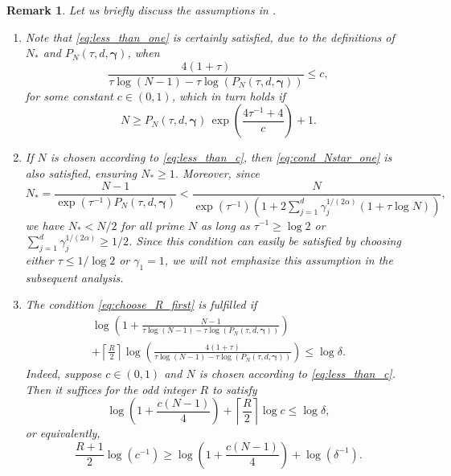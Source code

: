 \documentclass[pdflatex,sn-basic,Numbered]{sn-jnl}%
\newcommand{\bsgamma}{\boldsymbol{\gamma}}
\theoremstyle{thmstyleone}%
\newtheorem{remark}[theorem]{Remark}
\theoremstyle{thmstyletwo}%
\begin{document}
\begin{remark}\label{rmk:choosingRN}
  Let us briefly discuss the assumptions in .
  
  \begin{enumerate}
  \item Note that \eqref{eq:less_than_one} is certainly satisfied, due to the definitions of $N_*$ and $P_N(\tau,d,\bsgamma)$, when
  \[ 
    \frac{4(1+\tau)}{\tau \log (N-1)-\tau\log (P_{N} (\tau,d,\bsgamma)) } \le c,
  \]
  for some constant $c \in (0,1)$, which in turn holds if
  \begin{equation}\label{eq:less_than_c}
  N \ge P_N (\tau,d,\bsgamma)\, \exp \left(\frac{4\tau^{-1}+4 }{c} \right) + 1.
  \end{equation}

   \item If $N$ is chosen according to \eqref{eq:less_than_c}, then \eqref{eq:cond_Nstar_one} is also satisfied, ensuring $N_* \ge 1$. Moreover, since
  \[ 
  N_* = \frac{N-1}{\exp(\tau^{-1})P_{N}(\tau,d,\bsgamma)} < \frac{N}{\exp(\tau^{-1})\left(1+2\sum_{j=1}^d \gamma_j^{1/(2\alpha)}(1+\tau \log N)\right)},
  \]
  we have $N_* < N/2$ for all prime $N$ as long as $\tau^{-1} \ge \log 2$ or $\sum_{j=1}^d \gamma_j^{1/(2\alpha)} \ge 1/2$. Since this condition can easily be satisfied by choosing either $\tau \le 1/\log 2$ or $\gamma_1 = 1$, we will not emphasize this assumption in the subsequent analysis.

  \item The condition \eqref{eq:choose_R_first} is fulfilled if
  \begin{multline*}
   \log \left(1+\frac{N-1}{\tau\log (N-1) - \tau\log (P_{N} (\tau,d,\bsgamma)) }\right) 
   \\ + \left\lceil \frac{R}{2} \right\rceil \log \left(\frac{4(1+\tau)}{\tau\log (N-1) - \tau\log (P_{N} (\tau, d,\bsgamma)) }\right) \le \log \delta.
  \end{multline*} 
  Indeed, suppose $c \in (0,1)$ and $N$ is chosen according to \eqref{eq:less_than_c}. Then it suffices for the odd integer $R$ to satisfy 
  \[
   \log \left(1 + \frac{c (N-1)}{4}\right)
   + \left\lceil \frac{R}{2} \right\rceil \log c \le \log \delta,
  \]
  or equivalently,
  \begin{equation}\label{eq:choose_R_c}
  \frac{R+1}{2} \log \left(c^{-1}\right) \ge
  \log \left(1 + \frac{c (N-1)}{4}\right) + \log(\delta^{-1}).
  \end{equation}
  \end{enumerate}
\end{remark}
\end{document}
